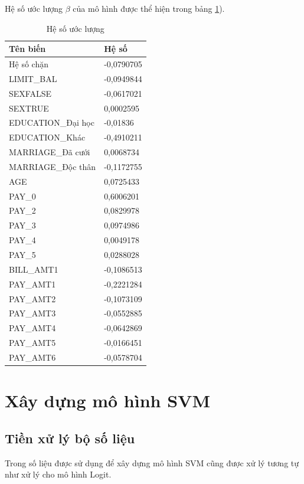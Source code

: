 \documentclass[a4paper]{report}\usepackage[]{graphicx}\usepackage[]{color}
\begin{document}
Hệ số ước lượng $\beta$ của mô hình được thể hiện trong bảng \ref{tab:lasso_final}). 

\begin{table}[htb!]
\centering
\begin{tabular}{ll}
  \hline
Tên biến & Hệ số \\ 
  \hline
Hệ số chặn & -0,0790705 \\ 
  LIMIT\_BAL & -0,0949844 \\ 
  SEXFALSE & -0,0617021 \\ 
  SEXTRUE & 0,0002595 \\ 
  EDUCATION\_Đại học & -0,01836 \\ 
  EDUCATION\_Khác & -0,4910211 \\ 
  MARRIAGE\_Đã cưới & 0,0068734 \\ 
  MARRIAGE\_Độc thân & -0,1172755 \\ 
  AGE & 0,0725433 \\ 
  PAY\_0 & 0,6006201 \\ 
  PAY\_2 & 0,0829978 \\ 
  PAY\_3 & 0,0974986 \\ 
  PAY\_4 & 0,0049178 \\ 
  PAY\_5 & 0,0288028 \\ 
  BILL\_AMT1 & -0,1086513 \\ 
  PAY\_AMT1 & -0,2221284 \\ 
  PAY\_AMT2 & -0,1073109 \\ 
  PAY\_AMT3 & -0,0552885 \\ 
  PAY\_AMT4 & -0,0642869 \\ 
  PAY\_AMT5 & -0,0166451 \\ 
  PAY\_AMT6 & -0,0578704 \\ 
   \hline
\end{tabular}
\caption{Hệ số ước lượng} 
\label{tab:lasso_final}
\end{table}



\section{Xây dựng mô hình SVM}

\subsection{Tiền xử lý bộ số liệu}
Trong số liệu được sử dụng để xây dựng mô hình SVM cũng được xử lý tương tự như xử lý cho mô hình Logit.
\end{document}
